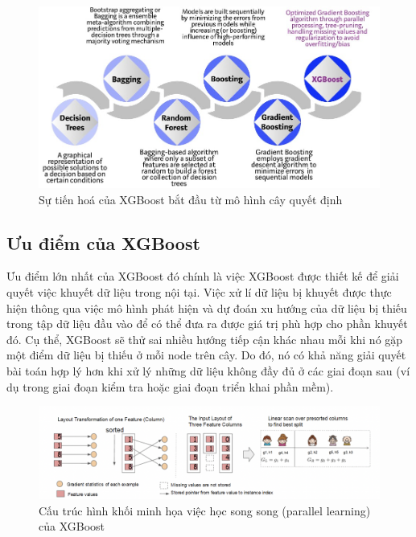 \documentclass{article}
\begin{document}
\begin{center} 
\begin{figure}[!h]
    \centering
    \includegraphics[scale=0.24]{evolution.jpeg}
    \caption{Sự tiến hoá của XGBoost bắt đầu từ mô hình cây quyết định \cite{An-xgboost}}
    \label{fig:evolution}
\end{figure}
\end{center}

\subsection{Ưu điểm của XGBoost}
Ưu điểm lớn nhất của XGBoost đó chính là việc XGBoost được thiết kế để giải quyết việc khuyết dữ liệu trong nội tại. Việc xử lí dữ liệu bị khuyết được thực hiện thông qua việc mô hình phát hiện và dự đoán xu hướng của dữ liệu bị thiếu trong tập dữ liệu đầu vào để có thể đưa ra được giá trị phù hợp cho phần khuyết đó. Cụ thể, XGBoost sẽ thử sai nhiều hướng tiếp cận khác nhau mỗi khi nó gặp một điểm dữ liệu bị thiếu ở mỗi node trên cây. Do đó, nó có khả năng giải quyết bài toán hợp lý hơn khi xử lý những dữ liệu không đầy đủ ở các giai đoạn sau (ví dụ trong giai đoạn kiểm tra hoặc giai đoạn triển khai phần mềm).

\begin{center} 
\begin{figure}[!h]
    \centering
    \includegraphics[scale=0.47]{parallel.png}
    \caption{Cấu trúc hình khối minh họa việc học song song (parallel learning) của XGBoost \cite{xgboost}}
    \label{fig:parallel}
\end{figure}
\end{center}
\end{document}
